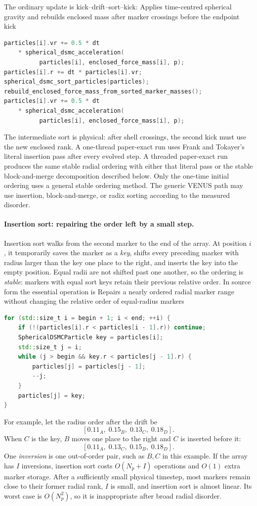The ordinary update is kick--drift--sort--kick:
{}
{Applies time-centred spherical gravity and rebuilds enclosed mass after marker
 crossings before the endpoint kick}
\begin{lstlisting}[language=C++]
particles[i].vr += 0.5 * dt
    * spherical_dsmc_acceleration(
          particles[i], enclosed_force_mass[i], p);
particles[i].r += dt * particles[i].vr;
spherical_dsmc_sort_particles(particles);
rebuild_enclosed_force_mass_from_sorted_marker_masses();
particles[i].vr += 0.5 * dt
    * spherical_dsmc_acceleration(
          particles[i], enclosed_force_mass[i], p);
\end{lstlisting}
The intermediate sort is physical: after shell crossings, the second kick
must use the new enclosed rank.  A one-thread paper-exact run uses Frank and
Tokayer's literal insertion pass after every evolved step.  A threaded
paper-exact run produces the same stable radial ordering with either that
literal pass or the stable block-and-merge decomposition described below.
Only the one-time initial ordering uses a general stable ordering method.
The generic VENUS path may use insertion, block-and-merge, or radix sorting
according to the measured disorder.

\paragraph{Insertion sort: repairing the order left by a small step.}
Insertion sort walks from the second marker to the end of the array.  At
position \(i\), it temporarily saves the marker as a \emph{key}, shifts every
preceding marker with radius larger than the key one place to the right, and
inserts the key into the empty position.  Equal radii are not shifted past one
another, so the ordering is \emph{stable}: markers with equal sort keys retain
their previous relative order.  In source form the essential operation is
{}
{Repairs a nearly ordered radial marker range without changing the relative
 order of equal-radius markers}
\begin{lstlisting}[language=C++]
for (std::size_t i = begin + 1; i < end; ++i) {
    if (!(particles[i].r < particles[i - 1].r)) continue;
    SphericalDSMCParticle key = particles[i];
    std::size_t j = i;
    while (j > begin && key.r < particles[j - 1].r) {
        particles[j] = particles[j - 1];
        --j;
    }
    particles[j] = key;
}
\end{lstlisting}
For example, let the radius order after the drift be
\[
 [0.11_A,\;0.15_B,\;0.13_C,\;0.18_D].
\]
When \(C\) is the key, \(B\) moves one place to the right and \(C\) is
inserted before it:
\[
 [0.11_A,\;0.13_C,\;0.15_B,\;0.18_D].
\]
One \emph{inversion} is one out-of-order pair, such as \(B,C\) in this
example.  If the array has \(I\) inversions, insertion sort costs
\(O(N_p+I)\) operations and \(O(1)\) extra marker storage.  After a sufficiently
small physical timestep, most markers remain close to their former radial
rank, \(I\) is small, and insertion sort is almost linear.  Its worst case is
\(O(N_p^2)\), so it is inappropriate after broad radial disorder.

